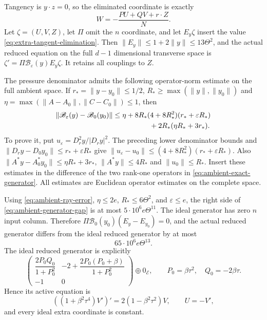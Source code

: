 Tangency is $y\cdot z=0$, so the eliminated coordinate is exactly
\begin{equation}\label{eq:extra-tangent-elimination}
 W=-\frac{PU+QV+r\cdot Z}{N}.
\end{equation}
Let $\zeta=(U,V,Z)$, let $\Pi$ omit the $n$ coordinate, and let
$E_y\zeta$ insert the value \eqref{eq:extra-tangent-elimination}.
Then $\|E_y\|\leq1+2\|y\|\leq13\Theta^2$, and the actual reduced
equation on the full $d-1$ dimensional transverse space is
$\zeta'=\Pi\mathscr B_\varepsilon(y)E_y\zeta$.
It retains all couplings to $Z$.

The pressure denominator admits the following operator-norm estimate on
 the full ambient space. If
$r_*=\|y-y_0\|\leq1/2$, $R_*\geq\max(\|y\|,\|y_0\|)$ and
$\eta=\max(\|A-A_0\|,\|C-C_0\|)\leq1$, then
\begin{align}
 \|\mathscr B_\varepsilon(y)-\mathscr B_0(y_0)\|
 &\leq \eta+
 8R_*(4+8R_*^2)(r_*+\varepsilon R_*)\nonumber\\
 &\hspace{18mm}+2R_*(\eta R_*+3r_*).              \label{eq:ambient-generator-gap}
\end{align}
To prove it, put $u_\varepsilon=D_r^2y/|D_ry|^2$.
The preceding lower denominator bounds and
$\|D_ry-D_0y_0\|\leq r_*+\varepsilon R_*$
give
$\|u_\varepsilon-u_0\|\leq
(4+8R_*^2)(r_*+\varepsilon R_*)$.
Also
$\|A^*y-A_0^*y_0\|\leq\eta R_*+3r_*$,
$\|A^*y\|\leq4R_*$ and $\|u_0\|\leq R_*$.
Insert these estimates in the difference of the two rank-one
operators in \eqref{eq:ambient-exact-generator}.
All estimates are Euclidean operator estimates on the complete space.

Using \eqref{eq:ambient-ray-error}, $\eta\leq2e$,
$R_*\leq6\Theta^2$, and $\varepsilon\leq e$, the right side of
\eqref{eq:ambient-generator-gap} is at most
$5\cdot10^6e\Theta^{11}$.
The ideal generator has zero $n$ input column.
Therefore
$\Pi\mathscr B_0(y_0)(E_y-E_{y_0})=0$, and the actual reduced generator
differs from the ideal reduced generator by at most
\begin{equation}\label{eq:ambient-reduced-gap}
 65\cdot10^6e\Theta^{13}.
\end{equation}
The ideal reduced generator is explicitly
\[
 \begin{pmatrix}
 \dfrac{2P_0Q_0}{1+P_0^2}&
       -2+\dfrac{2P_0(P_0+\beta)}{1+P_0^2}\\[2mm]
 -1&0
 \end{pmatrix}
 \oplus0_{\mathcal E},
 \qquad P_0=\beta\tau^2,\quad Q_0=-2\beta\tau .
\]
Hence its active equation is
\[
 ((1+\beta^2\tau^4)V')'=2(1-\beta^2\tau^2)V,\qquad U=-V',
\]
and every ideal extra coordinate is constant.

